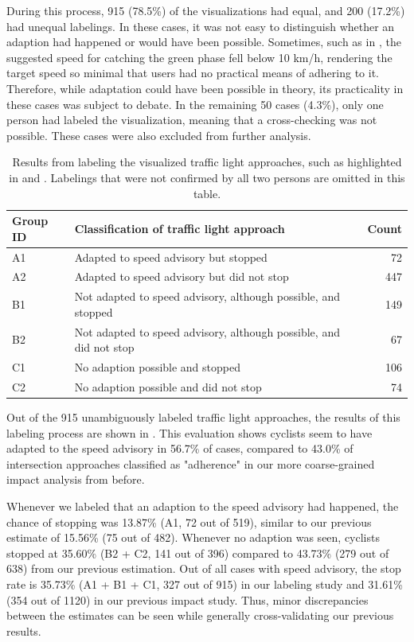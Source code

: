 During this process, 915 (78.5\%) of the visualizations had equal, and 200 (17.2\%) had unequal labelings. In these cases, it was not easy to distinguish whether an adaption had happened or would have been possible. Sometimes, such as in , the suggested speed for catching the green phase fell below 10 km/h, rendering the target speed so minimal that users had no practical means of adhering to it. Therefore, while adaptation could have been possible in theory, its practicality in these cases was subject to debate. In the remaining 50 cases (4.3\%), only one person had labeled the visualization, meaning that a cross-checking was not possible. These cases were also excluded from further analysis.

\begin{table}[t]
\centering
\begin{tabular}{@{}llr@{}}
\toprule
\textbf{Group ID} & \textbf{Classification of traffic light approach} & \textbf{Count} \\
\midrule
A1 & Adapted to speed advisory but stopped & 72 \\
A2 & Adapted to speed advisory but did not stop & 447 \\
B1 & Not adapted to speed advisory, although possible, and stopped & 149 \\
B2 & Not adapted to speed advisory, although possible, and did not stop & 67 \\
C1 & No adaption possible and stopped & 106 \\
C2 & No adaption possible and did not stop & 74 \\
\bottomrule
\end{tabular}
\caption{Results from labeling the visualized traffic light approaches, such as highlighted in  and . Labelings that were not confirmed by all two persons are omitted in this table.}
\label{tab:impacts-labeling-results}
\end{table}

Out of the 915 unambiguously labeled traffic light approaches, the results of this labeling process are shown in . This evaluation shows cyclists seem to have adapted to the speed advisory in 56.7\% of cases, compared to 43.0\% of intersection approaches classified as "adherence" in our more coarse-grained impact analysis from before. 

Whenever we labeled that an adaption to the speed advisory had happened, the chance of stopping was 13.87\% (A1, 72 out of 519), similar to our previous estimate of 15.56\% (75 out of 482). Whenever no adaption was seen, cyclists stopped at 35.60\% (B2 + C2, 141 out of 396) compared to 43.73\% (279 out of 638) from our previous estimation. Out of all cases with speed advisory, the stop rate is 35.73\% (A1 + B1 + C1, 327 out of 915) in our labeling study and 31.61\% (354 out of 1120) in our previous impact study. Thus, minor discrepancies between the estimates can be seen while generally cross-validating our previous results. 

